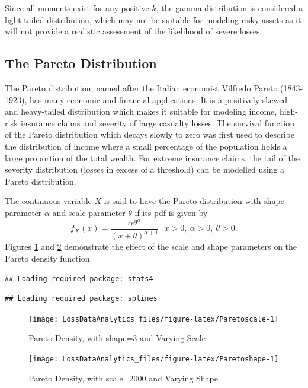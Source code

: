 \documentclass[]{book}
\begin{document}
Since all moments exist for any positive \(k\), the gamma distribution
is considered a light tailed distribution, which may not be suitable for
modeling risky assets as it will not provide a realistic assessment of
the likelihood of severe losses.

\subsection{The Pareto Distribution}\label{the-pareto-distribution}

The Pareto distribution, named after the Italian economist Vilfredo
Pareto (1843-1923), has many economic and financial applications. It is
a positively skewed and heavy-tailed distribution which makes it
suitable for modeling income, high-risk insurance claims and severity of
large casualty losses. The survival function of the Pareto distribution
which decays slowly to zero was first used to describe the distribution
of income where a small percentage of the population holds a large
proportion of the total wealth. For extreme insurance claims, the tail
of the severity distribution (losses in excess of a threshold) can be
modelled using a Pareto distribution.

The continuous variable \(X\) is said to have the Pareto distribution
with shape parameter \(\alpha\) and scale parameter \(\theta\) if its
pdf is given by
\[f_{X}\left( x \right) = \frac{\alpha\theta^{\alpha}}{\left( x + \theta \right)^{\alpha + 1}} \ \ \  x  >  0,\ \alpha >  0,\ \theta > 0.\]
Figures \ref{fig:Paretoscale} and \ref{fig:Paretoshape} demonstrate the
effect of the scale and shape parameters on the Pareto density function.

\begin{verbatim}
## Loading required package: stats4
\end{verbatim}

\begin{verbatim}
## Loading required package: splines
\end{verbatim}

\begin{figure}

{\centering \texttt{[image: LossDataAnalytics\_files/figure-latex/Paretoscale-1]} 

}

\caption{Pareto Density, with shape=3 and Varying Scale}\label{fig:Paretoscale}
\end{figure}

\begin{figure}

{\centering \texttt{[image: LossDataAnalytics\_files/figure-latex/Paretoshape-1]} 

}

\caption{Pareto Density, with scale=2000 and Varying Shape}\label{fig:Paretoshape}
\end{figure}
\end{document}
